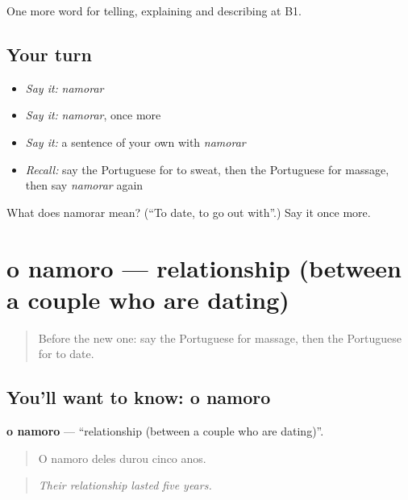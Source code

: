 \begin{grammarlens}[title={What you've built}]
One more word for telling, explaining and describing at B1.
\end{grammarlens}

\subsection*{Your turn}
\begin{itemize}
\raggedright
  \item \emph{Say it:} \emph{namorar}
  \item \emph{Say it:} \emph{namorar}, once more
  \item \emph{Say it:} a sentence of your own with \emph{namorar}
  \item \emph{Recall:} say the Portuguese for to sweat, then the Portuguese for massage, then say \emph{namorar} again
\end{itemize}

\begin{tcolorbox}[breakable,colback=teal!4,colframe=teal!35!black,title={Before you move on}]
What does namorar mean? (\textquotedblleft{}To date, to go out with\textquotedblright{}.) Say it once more.
\end{tcolorbox}
\section[o namoro]{o namoro — relationship (between a couple who are dating)}

\label{lesson:PT-C491-namoro}



\begin{quote}
Before the new one: say the Portuguese for massage, then the Portuguese for to date.
\end{quote}

\subsection*{You'll want to know: o namoro}
\textbf{o namoro} — \textquotedblleft{}relationship (between a couple who are dating)\textquotedblright{}.

\begin{quote}
O namoro deles durou cinco anos.
\end{quote}

\begin{quote}
\emph{Their relationship lasted five years.}
\end{quote}

